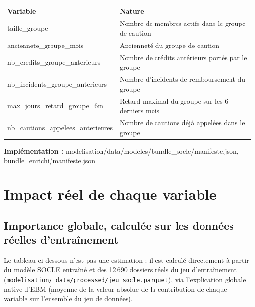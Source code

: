 \documentclass[11pt,a4paper]{article}
\newcommand{\brk}{\allowbreak}
\newcommand{\fichier}[1]{\noindent\textbf{Implémentation :} \tiny\ttfamily#1\normalfont\normalsize\par}
\begin{document}
\begin{longtable}{L{6cm}L{9cm}}
\toprule
\textbf{Variable} & \textbf{Nature} \\
\midrule
\endhead
taille\_groupe & Nombre de membres actifs dans le groupe de caution \\
anciennete\_groupe\_mois & Ancienneté du groupe de caution \\
nb\_credits\_groupe\_anterieurs & Nombre de crédits antérieurs portés par le groupe \\
nb\_incidents\_groupe\_anterieurs & Nombre d'incidents de remboursement du groupe \\
max\_jours\_retard\_groupe\_6m & Retard maximal du groupe sur les 6 derniers mois \\
nb\_cautions\_appelees\_anterieures & Nombre de cautions déjà appelées dans le groupe \\
\bottomrule
\end{longtable}

\fichier{modelisation/data/modeles/bundle\_socle/manifeste.json, bundle\_enrichi/manifeste.json}

\section{Impact réel de chaque variable}

\subsection{Importance globale, calculée sur les données réelles d'entraînement}

Le tableau ci-dessous n'est pas une estimation : il est calculé directement à partir du modèle
SOCLE entraîné et des 12\,690 dossiers réels du jeu d'entraînement (\texttt{modelisation/\brk
data/\brk processed/\brk jeu\_socle.parquet}), via l'explication globale native d'EBM (moyenne de
la valeur absolue de la contribution de chaque variable sur l'ensemble du jeu de données).
\end{document}
